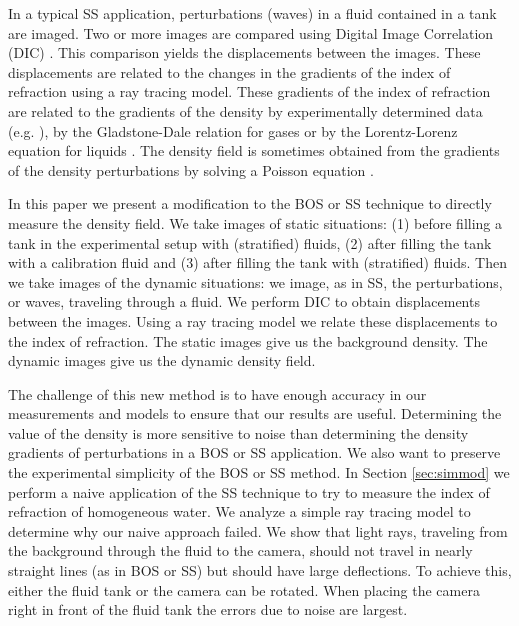 \documentclass{svjour3}                     %
\begin{document}
In a typical SS application, perturbations (waves) in a fluid contained in a tank are imaged. Two or more images are compared using Digital Image Correlation (DIC) \cite{sutton2009image}. This comparison yields the displacements between the images. These displacements are related to the changes in the gradients of the index of refraction using a ray tracing model. These gradients of the index of refraction are related to the gradients of the density by experimentally determined data (e.g. \cite{tan2015dependence}), by the Gladstone-Dale relation for gases \cite{born2013principles} or by the Lorentz-Lorenz equation for liquids \cite{lorentz1916theory}. The density field is sometimes obtained from the gradients of the density perturbations by solving a Poisson equation \cite{venkatakrishnan2004density, hazewinkel2011comparison,verso2015background}.

In this paper we present a modification to the BOS or SS technique to directly measure the density field. We take images of static situations:  (1) before filling a tank in the experimental setup with (stratified) fluids, (2) after filling the tank with a calibration fluid and (3) after filling the tank with (stratified) fluids. Then we take images of the dynamic situations: we image, as in SS, the perturbations, or waves, traveling through a fluid. We perform DIC to obtain displacements between the images. Using a ray tracing model we relate these displacements to the index of refraction. The static images give us the background density. The dynamic images give us the dynamic density field.

The challenge of this new method is to have enough accuracy in our measurements and models to ensure that our results are useful. Determining the value of the density is more sensitive to noise than determining the density gradients of perturbations in a BOS or SS application. We also want to preserve the experimental simplicity of the BOS or SS method. In Section \ref{sec:simmod} we perform a naive application of the SS technique to try to measure the index of refraction of homogeneous water. We analyze a simple ray tracing model to determine why our naive approach failed. We show that light rays, traveling from the background through the fluid to the camera, should not travel in nearly straight lines (as in BOS or SS) but should have large deflections. To achieve this, either the fluid tank or the camera can be rotated. When placing the camera right in front of the fluid tank the errors due to noise are largest.
\end{document}
